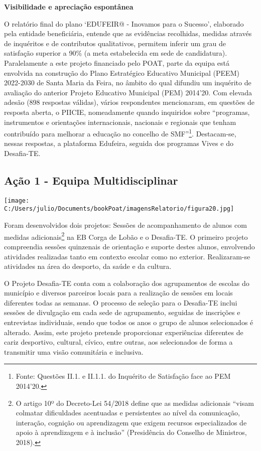 \documentclass[
]{book}
\begin{document}
\textbf{Visibilidade e apreciação espontânea}

O relatório final do plano `EDUFEIR@ - Inovamos para o Sucesso', elaborado pela entidade beneficiária, entende que as evidências recolhidas, medidas através de inquéritos e de contributos qualitativos, permitem inferir um grau de satisfação superior a 90\% (a meta estabelecida em sede de candidatura). Paralelamente a este projeto financiado pelo POAT, parte da equipa está envolvida na construção do Plano Estratégico Educativo Municipal (PEEM) 2022-2030 de Santa Maria da Feira, no âmbito do qual difundiu um inquérito de avaliação do anterior Projeto Educativo Municipal (PEM) 2014'20. Com elevada adesão (898 respostas válidas), vários respondentes mencionaram, em questões de resposta aberta, o PIICIE, nomeadamente quando inquiridos sobre ``programas, instrumentos e orientações internacionais, nacionais e regionais que tenham contribuído para melhorar a educação no concelho de SMF''\footnote{Fonte: Questões II.1. e II.1.1. do Inquérito de Satisfação face ao PEM 2014'20.}. Destacam-se, nessas respostas, a plataforma Edufeira, seguida dos programas Vives e do Desafia-TE.

\hypertarget{auxe7uxe3o-1---equipa-multidisciplinar}{%
\subsection{\texorpdfstring{\textbf{Ação 1 - Equipa Multidisciplinar}}{Ação 1 - Equipa Multidisciplinar}}\label{auxe7uxe3o-1---equipa-multidisciplinar}}

\texttt{[image: C:/Users/julio/Documents/bookPoat/imagensRelatorio/figura20.jpg]}

Foram desenvolvidos dois projetos: Sessões de acompanhamento de alunos com medidas adicionais\footnote{O artigo 10º do Decreto-Lei 54/2018 define que as medidas adicionais ``visam colmatar dificuldades acentuadas e persistentes ao nível da comunicação, interação, cognição ou aprendizagem que exigem recursos especializados de apoio à aprendizagem e à inclusão'' (Presidência do Conselho de Ministros, 2018).} na EB Corga de Lobão e o Desafia-TE. O primeiro projeto compreendia sessões quinzenais de orientação e suporte destes alunos, envolvendo atividades realizadas tanto em contexto escolar como no exterior. Realizaram-se atividades na área do desporto, da saúde e da cultura.

O Projeto Desafia-TE conta com a colaboração dos agrupamentos de escolas do município e diversos parceiros locais para a realização de sessões em locais diferentes todas as semanas. O processo de seleção para o Desafia-TE inclui sessões de divulgação em cada sede de agrupamento, seguidas de inscrições e entrevistas individuais, sendo que todos os anos o grupo de alunos selecionados é alterado. Assim, este projeto pretende proporcionar experiências diferentes de cariz desportivo, cultural, cívico, entre outras, aos selecionados de forma a transmitir uma visão comunitária e inclusiva.
\end{document}
